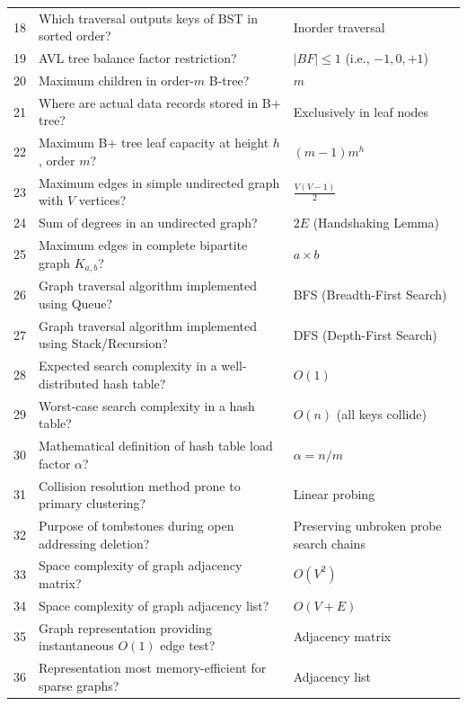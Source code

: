 \begin{longtable}{r p{9.8cm} p{6.8cm}}
18 & Which traversal outputs keys of BST in sorted order? & Inorder traversal \\
19 & AVL tree balance factor restriction? & $|BF| \leq 1$ (i.e., $-1, 0, +1$) \\
20 & Maximum children in order-$m$ B-tree? & $m$ \\
21 & Where are actual data records stored in B+ tree? & Exclusively in leaf nodes \\
22 & Maximum B+ tree leaf capacity at height $h$, order $m$? & $(m-1)m^h$ \\
23 & Maximum edges in simple undirected graph with $V$ vertices? & $\frac{V(V-1)}{2}$ \\
24 & Sum of degrees in an undirected graph? & $2E$ (Handshaking Lemma) \\
25 & Maximum edges in complete bipartite graph $K_{a,b}$? & $a \times b$ \\
26 & Graph traversal algorithm implemented using Queue? & BFS (Breadth-First Search) \\
27 & Graph traversal algorithm implemented using Stack/Recursion? & DFS (Depth-First Search) \\
28 & Expected search complexity in a well-distributed hash table? & $O(1)$ \\
29 & Worst-case search complexity in a hash table? & $O(n)$ (all keys collide) \\
30 & Mathematical definition of hash table load factor $\alpha$? & $\alpha = n / m$ \\
31 & Collision resolution method prone to primary clustering? & Linear probing \\
32 & Purpose of tombstones during open addressing deletion? & Preserving unbroken probe search chains \\
33 & Space complexity of graph adjacency matrix? & $O(V^2)$ \\
34 & Space complexity of graph adjacency list? & $O(V + E)$ \\
35 & Graph representation providing instantaneous $O(1)$ edge test? & Adjacency matrix \\
36 & Representation most memory-efficient for sparse graphs? & Adjacency list \\
\end{longtable}

